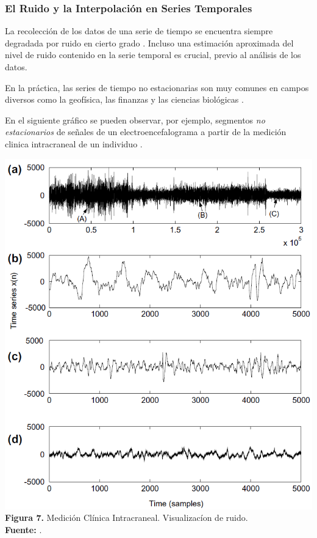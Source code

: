 \subsubsection{El Ruido y la Interpolaci\'on en Series Temporales}
La recolecci\'on de los datos de una serie de tiempo se encuentra siempre degradada por ruido en cierto grado \cite{noise}. Incluso una estimaci\'on aproximada del nivel de ruido contenido en la serie temporal es crucial, previo al an\'alisis de los datos.\par
En la pr\'actica, las series de tiempo no estacionarias son muy comunes en campos diversos como la geof\'isica, las finanzas y las ciencias biol\'ogicas \cite{concepts}.\par
En el siguiente gr\'afico se pueden observar, por ejemplo, segmentos \textit{no estacionarios} de se\~nales de un electroencefalograma a partir de la medici\'on clinica intracraneal de un individuo \cite{noise}.
\begin{center}
\includegraphics[scale=0.7]{brainsignal.png}\\
\vspace*{10pt}
\footnotesize{\textbf{Figura 7.} Medici\'on Cl\'inica Intracraneal. Visualizac\'ion de ruido.}\\ \textbf{Fuente:} \cite{noise}.
\end{center}
